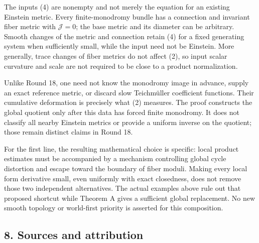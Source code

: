 \documentclass[
  11pt,
]{article}
\begin{document}
The inputs (4) are nonempty and not merely the equation for an existing
Einstein metric. Every finite-monodromy bundle has a connection and
invariant fiber metric with \(\mathcal J=0\); the base metric and its
diameter can be arbitrary. Smooth changes of the metric and connection
retain (4) for a fixed generating system when sufficiently small, while
the input need not be Einstein. More generally, trace changes of fiber
metrics do not affect (2), so input scalar curvature and scale are not
required to be close to a product normalization.

Unlike Round 18, one need not know the monodromy image in advance,
supply an exact reference metric, or discard slow Teichmüller
coefficient functions. Their cumulative deformation is precisely what
(2) measures. The proof constructs the global quotient only after this
data has forced finite monodromy. It does not classify all nearby
Einstein metrics or provide a uniform inverse on the quotient; those
remain distinct claims in Round 18.

For the first line, the resulting mathematical choice is specific: local
product estimates must be accompanied by a mechanism controlling global
cycle distortion and escape toward the boundary of fiber moduli. Making
every local form derivative small, even uniformly with exact closedness,
does not remove those two independent alternatives. The actual examples
above rule out that proposed shortcut while Theorem A gives a sufficient
global replacement. No new smooth topology or world-first priority is
asserted for this composition.

\hypertarget{sources-and-attribution}{%
\subsection{8. Sources and attribution}\label{sources-and-attribution}}
\end{document}
